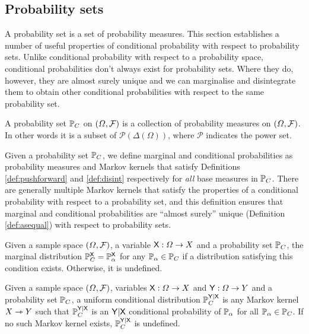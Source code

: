 

\subsection{Probability sets}\label{sec:probability_sets}

A probability set is a set of probability measures. This section establishes a number of useful properties of conditional probability with respect to probability sets. Unlike conditional probability with respect to a probability space, conditional probabilities don't always exist for probability sets. Where they do, however, they are almost surely unique and we can marginalise and disintegrate them to obtain other conditional probabilities with respect to the same probability set.

\begin{definition}
A probability set $\mathbb{P}_C$ on $(\Omega,\mathcal{F})$ is a collection of probability measures on $(\Omega,\mathcal{F})$. In other words it is a subset of $\mathscr{P}(\Delta(\Omega))$, where $\mathscr{P}$ indicates the power set.
\end{definition}

Given a probability set $\mathbb{P}_C$, we define marginal and conditional probabilities as probability measures and Markov kernels that satisfy Definitions \ref{def:pushforward} and \ref{def:disint} respectively for \emph{all} base measures in $\mathbb{P}_C$. There are generally multiple Markov kernels that satisfy the properties of a conditional probability with respect to a probability set, and this definition ensures that marginal and conditional probabilities are ``almost surely'' unique (Definition \ref{def:asequal}) with respect to probability sets.

\begin{definition}
Given a sample space $(\Omega,\mathcal{F})$, a variable $\mathsf{X}:\Omega\to X$ and a probability set $\mathbb{P}_C$, the marginal distribution $\mathbb{P}_C^{\mathsf{X}}=\mathbb{P}_\alpha^{\mathsf{X}}$ for any $\mathbb{P}_\alpha\in\mathbb{P}_C$ if a distribution satisfying this condition exists. Otherwise, it is undefined.
\end{definition}

\begin{definition}\label{def:cprob_pset}
Given a sample space $(\Omega,\mathcal{F})$, variables $\mathsf{X}:\Omega\to X$ and $\mathsf{Y}:\Omega\to Y$ and a probability set $\mathbb{P}_C$, a uniform conditional distribution $\mathbb{P}_C^{\mathsf{Y}|\mathsf{X}}$ is any Markov kernel $X\rightarrowtriangle Y$ such that $\mathbb{P}_C^{\mathsf{Y}|\mathsf{X}}$ is an $\mathsf{Y}|\mathsf{X}$ conditional probability of $\mathbb{P}_\alpha$ for all $\mathbb{P}_\alpha\in \mathbb{P}_C$. If no such Markov kernel exists, $\mathbb{P}_C^{\mathsf{Y}|\mathsf{X}}$ is undefined.
\end{definition}

